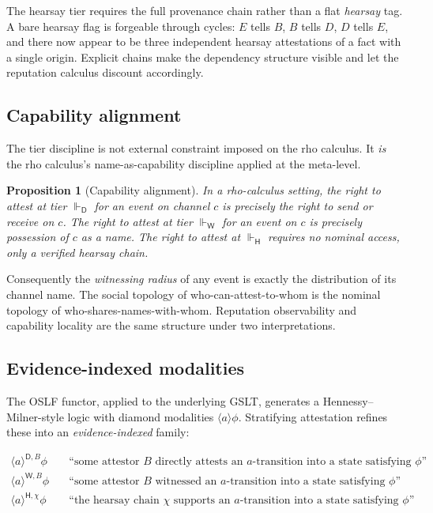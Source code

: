 \documentclass[11pt]{article}
\theoremstyle{definition}
\theoremstyle{plain}
\newtheorem{proposition}[definition]{Proposition}
\theoremstyle{remark}
\newcommand{\Att}{\mathrel{\Vdash}}
\newcommand{\AttD}{\Att_{\!\mathsf{D}}}
\newcommand{\AttW}{\Att_{\!\mathsf{W}}}
\newcommand{\AttH}{\Att_{\!\mathsf{H}}}
\begin{document}
The hearsay tier requires the full provenance chain rather than a flat \emph{hearsay} tag. A bare hearsay flag is forgeable through cycles: $E$ tells $B$, $B$ tells $D$, $D$ tells $E$, and there now appear to be three independent hearsay attestations of a fact with a single origin. Explicit chains make the dependency structure visible and let the reputation calculus discount accordingly.

\subsection{Capability alignment}

The tier discipline is not external constraint imposed on the rho calculus. It \emph{is} the rho calculus's name-as-capability discipline applied at the meta-level.

\begin{proposition}[Capability alignment]
In a rho-calculus setting, the right to attest at tier $\AttD$ for an event on channel $c$ is precisely the right to send or receive on $c$. The right to attest at tier $\AttW$ for an event on $c$ is precisely possession of $c$ as a name. The right to attest at $\AttH$ requires no nominal access, only a verified hearsay chain.
\end{proposition}

Consequently the \emph{witnessing radius} of any event is exactly the distribution of its channel name. The social topology of who-can-attest-to-whom is the nominal topology of who-shares-names-with-whom. Reputation observability and capability locality are the same structure under two interpretations.

\subsection{Evidence-indexed modalities}\label{ssec:modalities}

The OSLF functor, applied to the underlying GSLT, generates a Hennessy--Milner-style logic with diamond modalities $\langle a \rangle \phi$. Stratifying attestation refines these into an \emph{evidence-indexed} family:

\begin{align*}
\langle a \rangle^{\mathsf{D},B}\phi &\quad\text{``some attestor $B$ directly attests an $a$-transition into a state satisfying $\phi$''} \\
\langle a \rangle^{\mathsf{W},B}\phi &\quad\text{``some attestor $B$ witnessed an $a$-transition into a state satisfying $\phi$''} \\
\langle a \rangle^{\mathsf{H},\chi}\phi &\quad\text{``the hearsay chain $\chi$ supports an $a$-transition into a state satisfying $\phi$''}
\end{align*}
\end{document}
